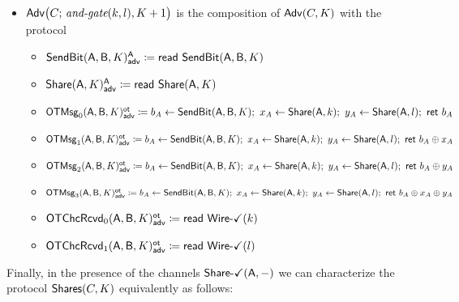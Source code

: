 \begin{itemize}
\item $\mathsf{Adv}\big(C; \, \textit{and-gate}(k,l),K+1\big)$ is the composition of $\mathsf{Adv}(C,K)$ with the protocol
\begin{itemize}
\item {\color{blue} $\mathsf{SendBit}(\mathsf{A},\mathsf{B},K)^{\mathsf{A}}_{\mathsf{adv}} \coloneqq \mathsf{read} \ \mathsf{SendBit}(\mathsf{A},\mathsf{B},K)$}
\item {\color{blue} $\mathsf{Share}(\mathsf{A},K)^{\mathsf{A}}_{\mathsf{adv}} \coloneqq \mathsf{read} \ \mathsf{Share}(\mathsf{A},K)$}\smallskip
\item {\color{blue} $\LeakOTMsg_0(\A,\B,K)^\ot_\adv \coloneqq b_A \leftarrow \SendBit(\A,\B,K); \ x_A \leftarrow \Share(\A,k); \ y_A \leftarrow \Share(\A,l); \ \ret{b_A}$}
\item {\color{blue} $\mathsf{OTMsg}_1(\mathsf{A},\mathsf{B},K)^{\mathsf{ot}}_{\mathsf{adv}} \coloneqq b_A \leftarrow \mathsf{SendBit}(\mathsf{A},\mathsf{B},K); \ x_A \leftarrow \mathsf{Share}(\mathsf{A},k); \ y_A \leftarrow \mathsf{Share}(\mathsf{A},l); \ \mathsf{ret} \ b_A \oplus x_A$}
\item {\color{blue} $\mathsf{OTMsg}_2(\mathsf{A},\mathsf{B},K)^{\mathsf{ot}}_{\mathsf{adv}} \coloneqq b_A \leftarrow \mathsf{SendBit}(\mathsf{A},\mathsf{B},K); \ x_A \leftarrow \mathsf{Share}(\mathsf{A},k); \ y_A \leftarrow \mathsf{Share}(\mathsf{A},l); \ \mathsf{ret} \ b_A \oplus y_A$}
\item {\color{blue} $\mathsf{OTMsg}_3(\mathsf{A},\mathsf{B},K)^{\mathsf{ot}}_{\mathsf{adv}} \coloneqq b_A \leftarrow \mathsf{SendBit}(\mathsf{A},\mathsf{B},K); \ x_A \leftarrow \mathsf{Share}(\mathsf{A},k); \ y_A \leftarrow \mathsf{Share}(\mathsf{A},l); \ \mathsf{ret} \ b_A \oplus x_A \oplus y_A$}\smallskip
\item {\color{blue} $\mathsf{OTChcRcvd}_0(\mathsf{A},\mathsf{B},K)^{\mathsf{ot}}_{\mathsf{adv}} \coloneqq \mathsf{read} \ \mathsf{Wire}\textsf{-}\checkmark(k)$}
\item {\color{blue} $\mathsf{OTChcRcvd}_1(\mathsf{A},\mathsf{B},K)^{\mathsf{ot}}_{\mathsf{adv}} \coloneqq \mathsf{read} \ \mathsf{Wire}\textsf{-}\checkmark(l)$}
\end{itemize}
\end{itemize}

\noindent Finally, in the presence of the channels $\mathsf{Share}\textsf{-}\checkmark(\mathsf{A},-)$ we can characterize the protocol $\mathsf{Shares}(C,K)$ equivalently as follows:

